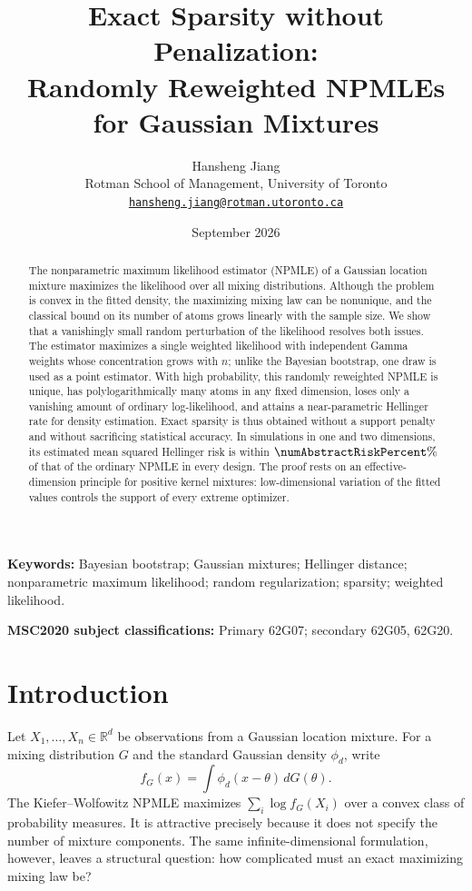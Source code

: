 \documentclass[11pt]{article}
\title{\bfseries Exact Sparsity without Penalization:\\
Randomly Reweighted NPMLEs for Gaussian Mixtures}
\author{Hansheng Jiang\\[0.3em]
\small Rotman School of Management, University of Toronto\\
\small \href{mailto:hansheng.jiang@rotman.utoronto.ca}{\texttt{hansheng.jiang@rotman.utoronto.ca}}}
\date{September 2026}
\theoremstyle{definition}
\theoremstyle{remark}
\newcommand{\RR}{\mathbb R}
\begin{document}
\maketitle

\begin{abstract}
The nonparametric maximum likelihood estimator (NPMLE) of a Gaussian
location mixture maximizes the likelihood over all mixing distributions.
Although the problem is convex in the fitted density, the maximizing mixing
law can be nonunique, and the classical bound on its number of atoms grows
linearly with the sample size.  We show that a vanishingly small random
perturbation of the likelihood resolves both issues.  The estimator
maximizes a single weighted likelihood with independent Gamma weights whose
concentration grows with $n$; unlike the Bayesian bootstrap, one draw is used
as a point estimator.  With high probability, this randomly reweighted NPMLE
is unique, has polylogarithmically many atoms in any fixed dimension, loses
only a vanishing amount of ordinary log-likelihood, and attains a
near-parametric Hellinger rate for density estimation.  Exact sparsity is
thus obtained without a support penalty and without sacrificing statistical
accuracy.  In simulations in one and two dimensions, its estimated mean squared Hellinger risk
is within $\numAbstractRiskPercent\%$ of that of the ordinary NPMLE in every design.  The proof
rests on an effective-dimension principle for positive kernel mixtures:
low-dimensional variation of the fitted values controls the support of every
extreme optimizer.
\end{abstract}

\noindent\textbf{Keywords:} Bayesian bootstrap; Gaussian mixtures; Hellinger
distance; nonparametric maximum likelihood; random regularization; sparsity;
weighted likelihood.

\smallskip
\noindent\textbf{MSC2020 subject classifications:} Primary 62G07;
secondary 62G05, 62G20.

\section{Introduction}\label{sec:introduction}

Let $X_1,\ldots,X_n\in\RR^d$ be observations from a Gaussian location
mixture.  For a mixing distribution $G$ and the standard Gaussian density
$\phi_d$, write
\[
  f_G(x)=\int \phi_d(x-\theta)\,dG(\theta).
\]
The Kiefer--Wolfowitz NPMLE \citep{kieferwolfowitz1956} maximizes
$\sum_i\log f_G(X_i)$ over a convex class of probability measures.  It is attractive precisely because it does
not specify the number of mixture components.  The same infinite-dimensional
formulation, however, leaves a structural question: how complicated must an
exact maximizing mixing law be?
\end{document}
